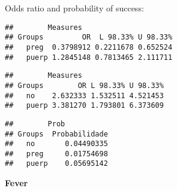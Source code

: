 \documentclass[
]{article}
\newenvironment{Shaded}{\begin{snugshade}}{\end{snugshade}}
\newcommand{\CommentTok}[1]{\textcolor[rgb]{0.56,0.35,0.01}{\textit{#1}}}
\newcommand{\KeywordTok}[1]{\textcolor[rgb]{0.13,0.29,0.53}{\textbf{#1}}}
\newcommand{\NormalTok}[1]{#1}
\newcommand{\OperatorTok}[1]{\textcolor[rgb]{0.81,0.36,0.00}{\textbf{#1}}}
\begin{document}
Odds ratio and probability of success:

\begin{Shaded}
\end{Shaded}

\begin{verbatim}
##        Measures
## Groups         OR  L 98.33% U 98.33%
##   preg  0.3798912 0.2211678 0.652524
##   puerp 1.2845148 0.7813465 2.111711
\end{verbatim}

\begin{Shaded}
\end{Shaded}

\begin{verbatim}
##        Measures
## Groups        OR L 98.33% U 98.33%
##   no    2.632333 1.532511 4.521453
##   puerp 3.381270 1.793801 6.373609
\end{verbatim}

\begin{Shaded}
\end{Shaded}

\begin{verbatim}
##        Prob
## Groups  Probabilidade
##   no       0.04490335
##   preg     0.01754698
##   puerp    0.05695142
\end{verbatim}

\textbf{Fever}
\end{document}
